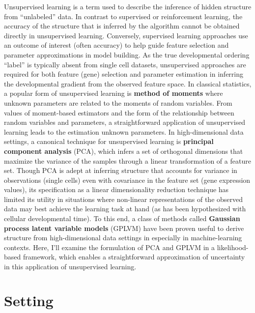 \documentclass[english, 11pt]{article}\usepackage[]{graphicx}\usepackage[]{color}
\begin{document}
Unsupervised learning is a term used to describe the inference of hidden structure from ``unlabeled'' data. \cite{hastie2009springer} In contrast to supervised or reinforcement learning, the accuracy of the structure that is inferred by the algorithm cannot be obtained directly in unsupervised learning. Conversely, supervised learning approaches use an outcome of interest (often accuracy) to help guide feature selection and parameter approximations in model building. As the true developmental ordering ``label'' is typically absent from single cell datasets, unsupervised approaches are required for both feature (gene) selection and parameter estimation in inferring the developmental gradient from the observed feature space. \newline \newline
In classical statistics, a popular form of unsupervised learning is \textbf{method of moments} where unknown parameters are related to the moments of random variables. \cite{hastie2009springer} From values of moment-based estimators and the form of the relationship between random variables and parameters, a straightforward application of unsupervised learning leads to the estimation unknown parameters. In high-dimensional data settings, a canonical technique for unsupervised learning is \textbf{principal component analysis} (PCA), which infers a set of orthogonal dimensions that maximize the variance of the samples through a linear transformation of a feature set. \cite{jolliffe2002principal} Though PCA is adept at inferring structure that accounts for variance in observations (single cells) even with covariance in the feature set (gene expression values), its specification as a linear dimensionality reduction technique has limited its utility in situations where non-linear representations of the observed data may best achieve the learning task at hand (as has been hypothesized with cellular developmental time). \cite{cannoodt2016computational} To this end, a class of methods called \textbf{Gaussian process latent variable models} (GPLVM) have been proven useful to derive structure from high-dimensional data settings in especially in machine-learning contexts. \cite{lawrence2004gaussian} Here, I'll examine the formulation of PCA and GPLVM in a likelihood-based framework, which enables a straightforward approximation of uncertainty in this application of unsupervised learning. 


\section{Setting}
\end{document}
